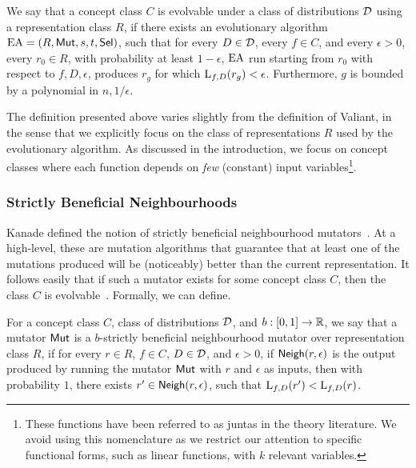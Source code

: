 \begin{definition} We say that a concept class $C$ is evolvable under a class of
distributions ${\mathcal D}$ using a representation class $R$, if there exists an
evolutionary algorithm $\mathrm{EA} = (R, \mathsf{Mut}, s, t, \mathsf{Sel})$, such that for every $D
\in {\mathcal D}$, every $f \in C$, and every $\epsilon > 0$, every $r_0 \in R$, with
probability at least $1 - \epsilon$, $\mathrm{EA}$ run starting from $r_0$ with
respect to $f, D, \epsilon$, produces $r_g$ for which $\mathrm{L}_{f, D}(r_g) <
\epsilon$. Furthermore, $g$ is bounded by a polynomial in $n, 1/\epsilon$.
\end{definition}

The definition presented above varies slightly from the definition of Valiant,
in the sense that we explicitly focus on the class of representations $R$ used
by the evolutionary algorithm. As discussed in the introduction, we focus on
concept classes where each function depends on \emph{few} (constant) input
variables\footnote{These functions have been referred to as juntas in the theory
literature. We avoid using this nomenclature as we restrict our attention to
specific functional forms, such as linear functions, with $k$ relevant
variables.}. 

\subsubsection{Strictly Beneficial Neighbourhoods}

Kanade \etal defined the notion of strictly beneficial neighbourhood
mutators~\cite{KVV:2010-drift}. At a high-level, these are mutation algorithms
that guarantee that at least one of the mutations produced will be (noticeably)
better than the current representation. It follows easily that if such a mutator
exists for some concept class $C$, then the class $C$ is
evolvable~\cite{KVV:2010-drift}. Formally, we can define.

\begin{definition} For a concept
class $C$, class of distributions ${\mathcal D}$, and $b : [0, 1] \rightarrow \mathbb{R}$, we
say that a mutator $\mathsf{Mut}$ is a $b$-strictly beneficial neighbourhood mutator
over representation class $R$, if for every $r \in R$, $f \in C$, $D \in
{\mathcal D}$, and $\epsilon > 0$, if $\mathsf{Neigh}(r, \epsilon)$ is the output produced by
running the mutator $\mathsf{Mut}$ with $r$ and $\epsilon$ as inputs, then with
probability $1$, there exists $r^\prime \in \mathsf{Neigh}(r, \epsilon)$, such that
$\mathrm{L}_{f, D}(r^\prime) < \mathrm{L}_{f, D}(r)$.  \end{definition}

